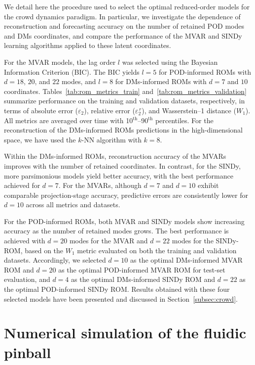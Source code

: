 \documentclass{article}
\begin{document}
We detail here the procedure used to select the optimal reduced-order models for the crowd dynamics paradigm. In particular, we investigate the dependence of reconstruction and forecasting accuracy on the number of retained POD modes and DMs coordinates, and compare the performance of the MVAR and SINDy learning algorithms applied to these latent coordinates.

For the MVAR models, the lag order \(l\) was selected using the Bayesian Information Criterion (BIC). The BIC yields \(l=5\) for POD-informed ROMs with \(d=18\), \(20\), and \(22\) modes, and \(l=8\) for DMs-informed ROMs with \(d=7\) and \(10\) coordinates. Tables~\ref{tab:rom_metrics_train} and~\ref{tab:rom_metrics_validation} summarize performance on the training and validation datasets, respectively, in terms of absolute error (\(\varepsilon_2\)), relative error (\(\varepsilon_2^{\,r}\)), and Wasserstein–1 distance ($W_1$). All metrics are averaged over time with 10$^{\text{th}}$–90$^{\text{th}}$ percentiles. For the reconstruction of the DMs-informed ROMs predictions in the high-dimensional space, we have used the $k$-NN algorithm with $k=8$.

Within the DMs-informed ROMs, reconstruction accuracy of the MVARs improves with the number of retained coordinates. In contrast, for the SINDy, more parsimonious models yield better accuracy, with the best performance achieved for \(d=7\). For the MVARs, although \(d=7\) and \(d=10\) exhibit comparable projection-stage accuracy, predictive errors are consistently lower for \(d=10\) across all metrics and datasets.

For the POD-informed ROMs, both MVAR and SINDy models show increasing accuracy as the number of retained modes grows. The best performance is achieved with \(d=20\) modes for the MVAR and \(d=22\) modes for the SINDy-ROM, based on the $W_1$ metric evaluated on both the training and validation datasets. Accordingly, we selected \(d=10\) as the optimal DMs-informed MVAR ROM and \(d=20\) as the optimal POD-informed MVAR ROM for test-set evaluation, and \(d=4\) as the optimal DMs-informed SINDy ROM and \(d=22\) as the optimal POD-informed SINDy ROM. Results obtained with these four selected models have been presented and discussed in Section~\ref{subsec:crowd}. 


\section{Numerical simulation of the fluidic pinball}
\label{app:Navier-Stokes}
\end{document}
